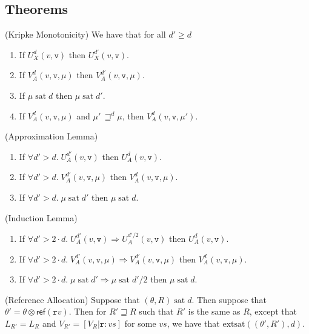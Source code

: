 \documentclass[preprint]{sigplanconf}
\newcommand{\betterstate}[3]{{#2}\, {\sqsupseteq}^{#1} {#3}}
\renewcommand{\implies}{\Rightarrow}
\newcommand{\term}[1]{\ensuremath{\mathtt{{#1}}}}
\newcommand{\satisfy}[2]{{#1}\;\mathrm{sat}\;{#2}}
\newcommand{\satisfyext}[2]{\mathrm{extsat}({#1}, {#2})}
\begin{document}
\subsection{Theorems}

\begin{prop}{(Kripke Monotonicity)}
We have that for all $d' \geq d$
\begin{enumerate}
\item If $U^d_X(v, \term{v})$ then $U^{d'}_X(v, \term{v})$. 
\item If $V^d_A(v, \term{v}, \mu)$ then $V^{d'}_A(v, \term{v}, \mu)$. 
\item If $\satisfy{\mu}{d}$ then $\satisfy{\mu}{d'}$. 
\item If $V^d_A(v, \term{v}, \mu)$ and $\betterstate{d}{\mu'}{\mu}$, then $V^d_A(v, \term{v}, \mu')$.
\end{enumerate}
\end{prop}

\begin{lemma}{(Approximation Lemma)}
\begin{enumerate}
  \item If $\forall d' > d.\; U^{d'}_A(v, \term{v})$ then $U^d_A(v, \term{v})$. 
  \item If $\forall d' > d.\; V^{d'}_A(v, \term{v}, \mu)$ then $V^d_A(v, \term{v}, \mu)$. 
  \item If $\forall d' > d.\; \satisfy{\mu}{d'}$ then $\satisfy{\mu}{d}$. 
\end{enumerate}
\end{lemma}

\begin{lemma}{(Induction Lemma)}
\begin{enumerate}
  \item If $\forall d' > 2\cdot d.\; U^{d'}_A(v, \term{v}) \implies U^{d'/2}_A(v, \term{v})$ then $U^d_A(v, \term{v})$. 
  \item If $\forall d' > 2\cdot d.\; V^{d'}_A(v, \term{v}, \mu) \implies V^{d'}_A(v, \term{v}, \mu)$ then $V^d_A(v, \term{v}, \mu)$. 
  \item If $\forall d' > 2\cdot d.\; \satisfy{\mu}{d'} \implies \satisfy{\mu}{d'/2}$ then $\satisfy{\mu}{d}$. 
\end{enumerate}
\end{lemma}

\begin{lemma}{(Reference Allocation)}
Suppose that $\satisfy{(\theta, R)}{d}$. Then suppose that $\theta' =
\theta \otimes \mathsf{ref}(\term{r}{v})$.  Then for $R' \sqsupseteq R$
such that $R'$ is the same as $R$, except that $L_{R'} = L_R$ and 
$V_{R'} = [V_R|\term{r}:vs]$ for some $vs$, we have that 
$\satisfyext{(\theta', R')}{d}$.
\end{lemma}
\end{document}
